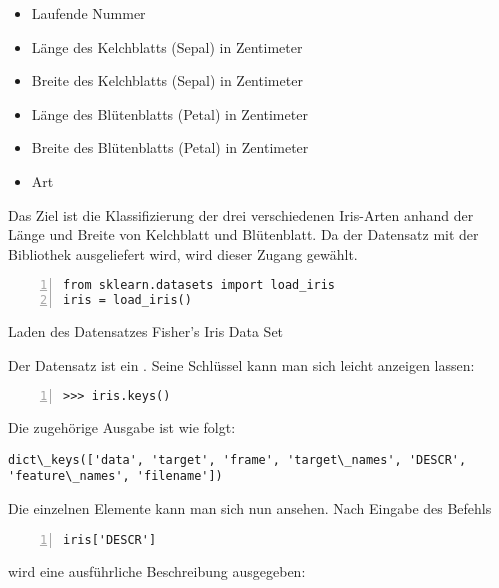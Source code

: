 \begin{itemize}
  \item Laufende Nummer
  \item Länge des  Kelchblatts (Sepal) in Zentimeter
  \item Breite des  Kelchblatts (Sepal) in Zentimeter
  \item Länge des Blütenblatts (Petal) in Zentimeter
  \item Breite des Blütenblatts (Petal) in Zentimeter
  \item Art    
\end{itemize}




Das Ziel ist die Klassifizierung der drei verschiedenen Iris-Arten anhand der Länge und Breite von Kelchblatt und Blütenblatt. Da der Datensatz mit der Bibliothek  ausgeliefert wird, wird dieser Zugang gewählt. 

\begin{code}
  \begin{lstlisting}[language=MyPython, numbers=left,label={src:irisimport}]
from sklearn.datasets import load_iris
iris = load_iris()
  \end{lstlisting}
  \caption{Laden des Datensatzes Fisher's Iris Data Set}
\end{code}


Der Datensatz ist ein . Seine Schlüssel kann man sich leicht anzeigen lassen:

\begin{lstlisting}[language=MyPython, numbers=left]
>>> iris.keys()
\end{lstlisting}

Die zugehörige Ausgabe ist wie folgt:

\begin{lstlisting}[numbers=none]
    dict\_keys(['data', 'target', 'frame', 'target\_names', 'DESCR', 'feature\_names', 'filename'])
\end{lstlisting}



Die einzelnen Elemente kann man sich nun ansehen. Nach Eingabe des Befehls 

\begin{lstlisting}[language=MyPython, numbers=left]
iris['DESCR']
\end{lstlisting}

wird eine ausführliche Beschreibung ausgegeben:

